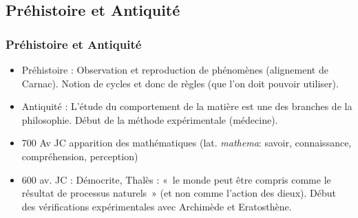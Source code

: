 
\subsection{Préhistoire et Antiquité}

\begin{frame} \frametitle{Préhistoire et Antiquité}
  \begin{itemize}
  \item Préhistoire : Observation et reproduction de phénomènes
    (alignement de Carnac). Notion de cycles et donc de règles (que
    l'on doit pouvoir utiliser).


  \item Antiquité : L'étude du comportement de la matière est une des
    branches de la philosophie. Début de la méthode expérimentale
    (médecine).

  \item 700 Av JC apparition des mathématiques (lat. \emph{mathema}:
    savoir, connaissance, compréhension, perception)

  \item 600 av. JC : Démocrite, Thalès : «~le monde peut être compris
    comme le résultat de processus naturels~» (et non comme l'action
    des dieux).  Début des vérifications expérimentales avec Archimède
    et Eratosthène.


  \end{itemize}

\end{frame}
